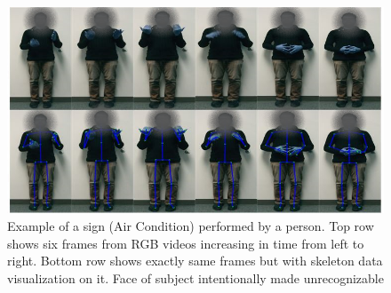 \documentclass[10pt,twocolumn,letterpaper]{article}
\begin{document}
\begin{figure}
	\begin{center}
		\includegraphics[width=.8\linewidth]{ac_person1_faceoff}
	\end{center}
	\caption{Example of a sign (Air Condition) performed by a person. Top row shows six frames from RGB videos increasing in time from left to right. Bottom row shows exactly same frames but with skeleton data visualization on it. Face of subject intentionally made unrecognizable}
	\label{fig:ac_person1}
\end{figure}
\end{document}
